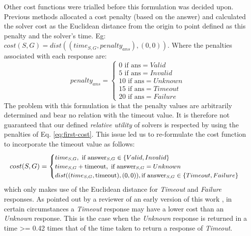 Other cost functions were trialled before this formulation was decided upon.
Previous methods allocated a cost penalty (based on the answer) and calculated the solver cost as the Euclidean distance from the origin to point defined as this penalty and the solver's time. 
Eg: $cost(S,G) = dist((time_{S,G}, penalty_{ans}),(0,0))$.
Where the penalties associated with each response are:
\begin{equation}
\label{eq:first-cost}
penalty_{ans} = \begin{cases}
0 \text{ if ans} = Valid \\
5 \text{ if ans} = Invalid \\
10 \text{ if ans} = Unknown \\
15 \text{ if ans} = Timeout \\
20 \text{ if ans} = Failure
\end{cases}
\end{equation}
The problem with this formulation is that the penalty values are arbitrarily determined and bear no relation with the timeout value. 
It is therefore not guaranteed that our defined \textit{relative utility} of solvers is respected by using the penalties of Eq. \ref{eq:first-cost}. 
This issue led us to re-formulate the cost function to incorporate the timeout value as follows:
\begin{equation}
\label{eq:second-cost}
\small
cost(S,G) = 
\begin{cases}
time_{S,G}, \text{ if answer}_{S,G} \in \lbrace Valid, Invalid \rbrace \\
time_{S,G} + \text{timeout}, \text{ if answer}_{S,G} = Unknown \\
dist((time_{S,G},\text{timeout}), (0,0)), \text{if answer}_{S,G} \in \lbrace Timeout, Failure \rbrace
\end{cases}
\end{equation}
which only makes use of the Euclidean distance for \textit{Timeout} and \textit{Failure} responses.
As pointed out by a reviewer of an early version of this work \cite{FIDE2016}, in certain circumstances a \textit{Timeout} response may have a lower cost than an \textit{Unknown} response.
This is the case when the \textit{Unknown} response is returned in a time >= 0.42 times that of the time taken to return a response of \textit{Timeout}. 
